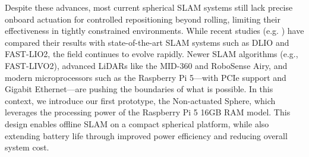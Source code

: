 \documentclass[conference]{IEEEtran}
\begin{document}
\hspace*{1em}Despite these advances, most current spherical SLAM systems still lack precise onboard actuation for controlled repositioning beyond rolling, limiting their effectiveness in tightly constrained environments. While recent studies (e.g. \cite{Kalman_filter_sphere}) have compared their results with state-of-the-art SLAM systems such as DLIO\cite{dlio} and FAST-LIO2\cite{fastlio2}, the field continues to evolve rapidly. Newer SLAM algorithms (e.g., FAST-LIVO2\cite{fastlivo2}), advanced LiDARs like the MID-360 and RoboSense Airy, and modern microprocessors such as the Raspberry Pi 5—with PCIe support and Gigabit Ethernet—are pushing the boundaries of what is possible. In this context, we introduce our first prototype, the Non-actuated Sphere, which leverages the processing power of the Raspberry Pi 5 16GB RAM model. This design enables offline SLAM on a compact spherical platform, while also extending battery life through improved power efficiency and reducing overall system cost.
\end{document}
